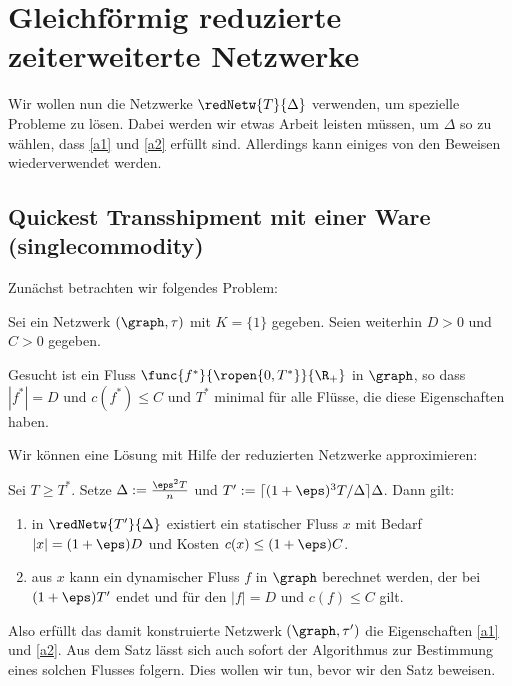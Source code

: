 \section{Gleichförmig reduzierte zeiterweiterte Netzwerke}\label{sec:unif_cond}
Wir wollen nun die Netzwerke $\redNetw{T}{\Delta}$ verwenden, um spezielle
Probleme zu lösen. Dabei werden wir etwas Arbeit leisten müssen, um
$\Delta$ so zu wählen, dass \ref{a1} und \ref{a2} erfüllt sind.
Allerdings kann einiges von den Beweisen wiederverwendet werden.

\subsection{Quickest Transshipment mit einer Ware (singlecommodity)}
Zunächst betrachten wir folgendes Problem:

\begin{problem}
\label{prob:qtp_single}
    Sei ein Netzwerk $(\graph, \tau)$ mit $K=\{1\}$ gegeben.
    Seien weiterhin $D > 0$ und $C > 0$ gegeben.
    
    Gesucht ist ein Fluss $\func{f^*}{\ropen{0,T^*}}{\R_+}$ in $\graph$,
    so dass $|f^*| = D$ und $c(f^*) \leq C$ und $T^*$ minimal für alle Flüsse,
    die diese Eigenschaften haben.
\end{problem}

Wir können eine Lösung mit Hilfe der reduzierten Netzwerke approximieren:

\begin{theorem}\label{theo:qtp_flow_ex}
    Sei $T \geq T^*$. Setze $\Delta := \frac{\eps^2 T}{n}$ und
    $T' := \lceil (1+\eps)^3 T / \Delta \rceil \Delta$.
    Dann gilt:
    \begin{enumerate}[label={\alph*)}]
        \item in $\redNetw{T'}{\Delta}$ existiert ein statischer Fluss $x$ mit
            Bedarf $|x| = (1 + \eps)D$ und Kosten $c(x) \leq (1+\eps)C$.
        \item aus $x$ kann ein dynamischer Fluss $f$ in $\graph$ berechnet werden,
            der bei $(1+\eps)T'$ endet und für den $|f| = D$ und $c(f) \leq C$
            gilt.
    \end{enumerate}
\end{theorem}

Also erfüllt das damit konstruierte Netzwerk $(\graph, \tau')$ die Eigenschaften
\ref{a1} und \ref{a2}. Aus dem Satz lässt sich auch sofort der Algorithmus
zur Bestimmung eines solchen Flusses folgern. Dies wollen wir tun,
bevor wir den Satz beweisen.

